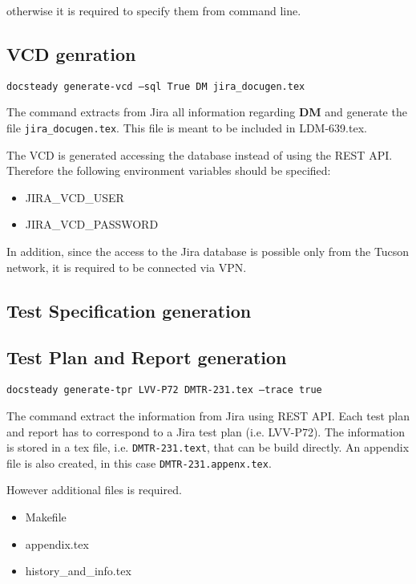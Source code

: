 \documentclass[DM]{lsstdoc}
\begin{document}
otherwise it is required to specify them from command line.


\subsection{VCD genration}

\texttt{docsteady generate-vcd --sql True DM jira\_docugen.tex}

The command extracts from Jira all information regarding \textbf{DM} and generate the file \texttt{jira\_docugen.tex}.
This file is meant to be included in LDM-639.tex.

The VCD is generated accessing the database instead of using the REST API. Therefore the following environment variables should be specified:

\begin{itemize}
\item JIRA\_VCD\_USER
\item JIRA\_VCD\_PASSWORD
\end{itemize}

In addition, since the access to the Jira database is possible only from the Tucson network, it is required to be connected via VPN.


\subsection{Test Specification generation}


\subsection{Test Plan and Report generation}

\texttt{docsteady generate-tpr LVV-P72 DMTR-231.tex --trace true}

The command extract the information from Jira using REST API.
Each test plan and report has to correspond to a Jira test plan (i.e. LVV-P72).
The information is stored in a tex file, i.e. \texttt{DMTR-231.text}, that can be build directly.
An appendix file is also created, in this case \texttt{DMTR-231.appenx.tex}.

However additional files is required.

\begin{itemize}
\item Makefile
\item appendix.tex
\item history\_and\_info.tex
\end{itemize}
\end{document}
